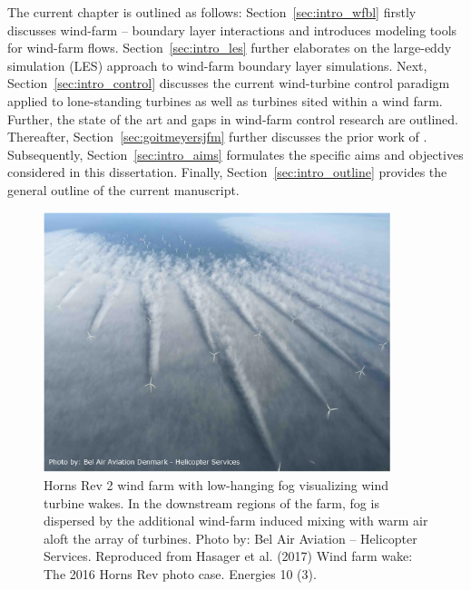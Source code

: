 The current chapter is outlined as follows: Section~\ref{sec:intro_wfbl} firstly discusses wind-farm -- boundary layer interactions and introduces modeling tools for wind-farm flows. Section~\ref{sec:intro_les} further elaborates on the large-eddy simulation (LES) approach to wind-farm boundary layer simulations. Next, Section~\ref{sec:intro_control} discusses the current wind-turbine control paradigm applied to lone-standing turbines as well as turbines sited within a wind farm. Further, the state of the art and gaps in wind-farm control research are outlined. Thereafter, Section~\ref{sec:goitmeyersjfm} further discusses the prior work of \cite{goit2015optimal}. Subsequently, Section~\ref{sec:intro_aims} formulates the specific aims and objectives considered in this dissertation. Finally, Section~\ref{sec:intro_outline} provides the general outline of the current manuscript.

\begin{figure}[t]
	\centering
	\includegraphics[width=0.9\textwidth]{chapters/introduction/HR2.eps}
	\caption[Horns Rev 2 wind farm with low-hanging fog visualizing wind turbine wakes.]{Horns Rev 2 wind farm with low-hanging fog visualizing wind turbine wakes. In the downstream regions of the farm, fog is dispersed by the additional wind-farm induced mixing with warm air aloft the array of turbines. Photo by: Bel Air Aviation -- Helicopter Services. Reproduced from Hasager et al. (2017) Wind farm wake: The 2016 Horns Rev photo case. Energies 10 (3). \label{fig:horns_rev}}
\end{figure}


